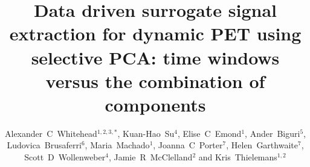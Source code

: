 \documentclass[12pt]{iopart}
\begin{document}
    \title[Data driven surrogate signal extraction for dynamic PET using selective PCA]{Data driven surrogate signal extraction for dynamic PET using selective PCA: time windows versus the combination of components}
    
    \author{Alexander~C~Whitehead$^{1, 2, 3, *}$, Kuan-Hao~Su$^4$, Elise~C~Emond$^1$, Ander~Biguri$^5$, Ludovica~Brusaferri$^6$, Maria~Machado$^1$, Joanna~C~Porter$^7$, Helen~Garthwaite$^7$, Scott~D~Wollenweber$^4$, Jamie~R~McClelland$^2$ and Kris~Thielemans$^{1, 2}$}
    
    \address{$^1$ Institute of Nuclear Medicine, University College London, UK}
    \address{$^2$ Centre for Medical Image Computing, University College London, UK}
    \address{$^3$ Department of Computer Science, University College London, UK}
    \address{$^4$ Molecular Imaging and Computed Tomography Engineering, GE Healthcare, USA}
    \address{$^5$ Department of Applied Mathematics and Theoretical Physics, University of Cambridge, UK}
    \address{$^6$ Computer Science and Informatics, London South Bank University, UK}
    \address{$^7$ Centre for Respiratory Medicine, University College London, UK}
    \address{$^*$ Author to whom any correspondence should be addressed.}
    
    
\end{document}
